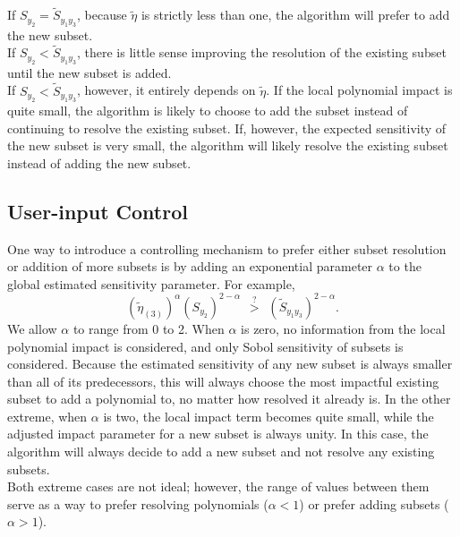 \documentclass[11pt]{article}
\begin{document}
If $S_{y_2} = \tilde S_{y_1y_3}$, because $\tilde\eta$ is strictly less than one, the algorithm will prefer to add the new subset.\\

If $S_{y_2} < \tilde S_{y_1y_3}$, there is little sense improving the resolution of the existing subset until the new subset is added.\\

If $S_{y_2} < \tilde S_{y_1y_3}$, however, it entirely depends on $\tilde\eta$.  If the local polynomial impact is quite small, the algorithm is likely to choose to add the subset instead of continuing to resolve the existing subset.  If, however, the expected sensitivity of the new subset is very small, the algorithm will likely resolve the existing subset instead of adding the new subset.\\

\subsection{User-input Control}
One way to introduce a controlling mechanism to prefer either subset resolution or addition of more subsets is by adding an exponential parameter $\alpha$ to the global estimated sensitivity parameter.  For example,
\begin{equation}
(\tilde\eta_{(3)})^\alpha (S_{y_2})^{2-\alpha} \hspace{5pt}\stackrel{?}>\hspace{5pt} (\tilde S_{y_1y_3})^{2-\alpha}.
\end{equation}
We allow $\alpha$ to range from 0 to 2.  When $\alpha$ is zero, no information from the local polynomial impact is considered, and only Sobol sensitivity of subsets is considered.  Because the estimated sensitivity of any new subset is always smaller than all of its predecessors, this will always choose the most impactful existing subset to add a polynomial to, no matter how resolved it already is.  In the other extreme, when $\alpha$ is two, the local impact term becomes quite small, while the adjusted impact parameter for a new subset is always unity.  In this case, the algorithm will always decide to add a new subset and not resolve any existing subsets.\\

Both extreme cases are not ideal; however, the range of values between them serve as a way to prefer resolving polynomials ($\alpha<1$) or prefer adding subsets ($\alpha>1$).
\end{document}
